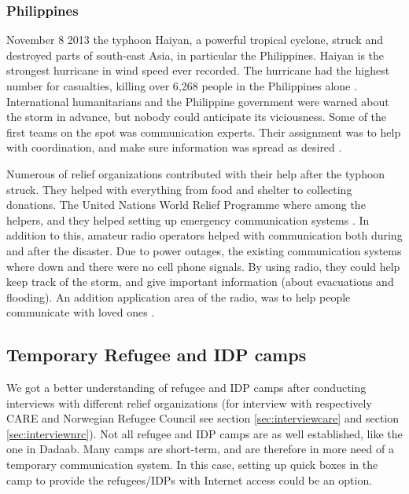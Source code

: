 \subsubsection{Philippines}
November 8 2013 the typhoon Haiyan, a powerful tropical cyclone, struck and destroyed parts of south-east Asia, in particular the Philippines. Haiyan is the strongest hurricane in wind speed ever recorded. The hurricane had the highest number for casualties, killing over 6,268 people in the Philippines alone \cite{wikiHaiyan}. International humanitarians and the Philippine government were warned about the storm in advance, but nobody could anticipate its viciousness. Some of the first teams on the spot was communication experts. Their assignment was to help with coordination, and make sure information was spread as desired \cite{disasterResponse}.

Numerous of relief organizations contributed with their help after the typhoon struck. They helped with everything from food and shelter to collecting donations. The United Nations World Relief Programme where among the helpers, and they helped setting up emergency communication systems \cite{philippines}. In addition to this, amateur radio operators helped with communication both during and after the disaster. Due to power outages, the existing communication systems where down and there were no cell phone signals. By using radio, they could help keep track of the storm, and give important information (about evacuations and flooding). An addition application area of the radio, was to help people communicate with loved ones \cite{philippinesradio}. 


\subsection{Temporary Refugee and IDP camps}
We got a better understanding of refugee and IDP camps after conducting interviews with different relief organizations (for interview with respectively CARE and Norwegian Refugee Council see section \ref{sec:interviewcare} and section \ref{sec:interviewnrc}). 
Not all refugee and IDP camps are as well established, like the one in Dadaab. Many camps are short-term, and are therefore in more need of a temporary communication system. In this case, setting up \gls{quick} boxes in the camp to provide the refugees/IDPs with Internet access could be an option. 

